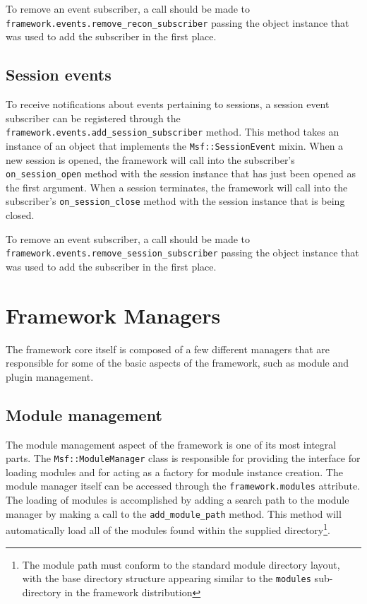 \documentclass{report}
\begin{document}
\par
To remove an event subscriber, a call should be made to\\
\texttt{framework.events.remove\_recon\_subscriber} passing the
object instance that was used to add the subscriber in the first
place.

        \subsection{Session events}

\par
To receive notifications about events pertaining to sessions, a
session event subscriber can be registered through the
\texttt{framework.events.add\_session\_subscriber} method.  This
method takes an instance of an object that implements the
\texttt{Msf::SessionEvent} mixin.  When a new session is opened, the
framework will call into the subscriber's \texttt{on\_session\_open}
method with the session instance that has just been opened as the
first argument.  When a session terminates, the framework will call
into the subscriber's \texttt{on\_session\_close} method with the
session instance that is being closed.

\par
To remove an event subscriber, a call should be made to\\
\texttt{framework.events.remove\_session\_subscriber} passing the
object instance that was used to add the subscriber in the first
place.

    \section{Framework Managers}

\par
The framework core itself is composed of a few different managers
that are responsible for some of the basic aspects of the framework,
such as module and plugin management.

        \subsection{Module management}

\par
The module management aspect of the framework is one of its most
integral parts.  The \texttt{Msf::ModuleManager} class is
responsible for providing the interface for loading modules and for
acting as a factory for module instance creation.  The module
manager itself can be accessed through the
\texttt{framework.modules} attribute.  The loading of modules is
accomplished by adding a search path to the module manager by making
a call to the \texttt{add\_module\_path} method.  This method will
automatically load all of the modules found within the supplied
directory\footnote{The module path must conform to the standard
module directory layout, with the base directory structure appearing
similar to the \texttt{modules} sub-directory in the framework
distribution}.
\end{document}

